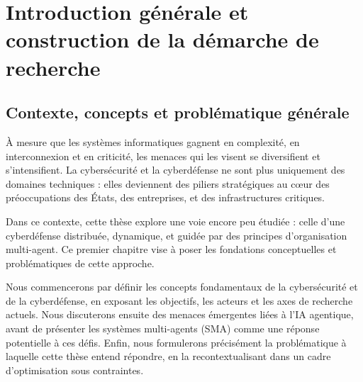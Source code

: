 \documentclass[ twoside,openright,titlepage,numbers=noenddot,headinclude,%
                footinclude=true,cleardoublepage=empty,abstractoff, %
                BCOR=5mm,paper=a4,fontsize=11pt,%
                french,american,%
                ]{scrreprt}
\begin{document}
\frenchspacing
\raggedbottom
{} %
\pagestyle{plain}




\cleardoublepage
\cleardoublepage

\cleardoublepage 
\pagestyle{scrheadings}
\cleardoublepage 

\cleardoublepage{}
\cleardoublepage


\part{Introduction générale et construction de la démarche de recherche}

\chapter{Contexte, concepts et problématique générale}

\noindent
À mesure que les systèmes informatiques gagnent en complexité, en interconnexion et en criticité, les menaces qui les visent se diversifient et s’intensifient. La cybersécurité et la cyberdéfense ne sont plus uniquement des domaines techniques : elles deviennent des piliers stratégiques au cœur des préoccupations des États, des entreprises, et des infrastructures critiques.

Dans ce contexte, cette thèse explore une voie encore peu étudiée : celle d’une cyberdéfense distribuée, dynamique, et guidée par des principes d’organisation multi-agent. Ce premier chapitre vise à poser les fondations conceptuelles et problématiques de cette approche.

Nous commencerons par définir les concepts fondamentaux de la cybersécurité et de la cyberdéfense, en exposant les objectifs, les acteurs et les axes de recherche actuels. Nous discuterons ensuite des menaces émergentes liées à l’IA agentique, avant de présenter les systèmes multi-agents (SMA) comme une réponse potentielle à ces défis. Enfin, nous formulerons précisément la problématique à laquelle cette thèse entend répondre, en la recontextualisant dans un cadre d’optimisation sous contraintes.
\end{document}
